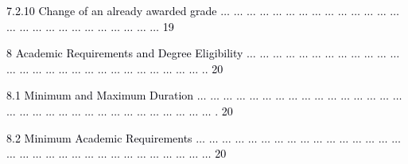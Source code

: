 \documentclass[12pt]{article}
\begin{document}
\vspace{\baselineskip}
\begin{adjustwidth}{0.5in}{0.0in}
{\fontsize{7pt}{8.4pt}\selectfont \textcolor[HTML]{00000A}{7.2.10 Change of an already awarded grade $ \ldots $ $ \ldots $ $ \ldots $ $ \ldots $ $ \ldots $ $ \ldots $ $ \ldots $ $ \ldots $ $ \ldots $ $ \ldots $ $ \ldots $ $ \ldots $ $ \ldots $ $ \ldots $ $ \ldots $ $ \ldots $ $ \ldots $ $ \ldots $ $ \ldots $ $ \ldots $ $ \ldots $ $ \ldots $ $ \ldots $ $ \ldots $ $ \ldots $ $ \ldots $  19}\par}\par

\end{adjustwidth}


\vspace{\baselineskip}
{\fontsize{7pt}{8.4pt}\selectfont \textcolor[HTML]{00000A}{8 Academic Requirements and Degree Eligibility $ \ldots $ $ \ldots $ $ \ldots $ $ \ldots $ $ \ldots $ $ \ldots $ $ \ldots $ $ \ldots $ $ \ldots $ $ \ldots $ $ \ldots $ $ \ldots $ $ \ldots $ $ \ldots $ $ \ldots $ $ \ldots $ $ \ldots $ $ \ldots $ $ \ldots $ $ \ldots $ $ \ldots $ $ \ldots $ $ \ldots $ $ \ldots $ $ \ldots $ $ \ldots $ $ \ldots $ .. 20}\par}\par


\vspace{\baselineskip}
\begin{adjustwidth}{0.21in}{0.0in}
{\fontsize{7pt}{8.4pt}\selectfont \textcolor[HTML]{00000A}{8.1 Minimum and Maximum Duration $ \ldots $ $ \ldots $ $ \ldots $ $ \ldots $ $ \ldots $ $ \ldots $ $ \ldots $ $ \ldots $ $ \ldots $ $ \ldots $ $ \ldots $ $ \ldots $ $ \ldots $ $ \ldots $ $ \ldots $ $ \ldots $ $ \ldots $ $ \ldots $ $ \ldots $ $ \ldots $ $ \ldots $ $ \ldots $ $ \ldots $ $ \ldots $ $ \ldots $ $ \ldots $ $ \ldots $ $ \ldots $ $ \ldots $ $ \ldots $ $ \ldots $ $ \ldots $ . 20}\par}\par

\end{adjustwidth}


\vspace{\baselineskip}
\begin{adjustwidth}{0.21in}{0.0in}
{\fontsize{7pt}{8.4pt}\selectfont \textcolor[HTML]{00000A}{8.2 Minimum Academic Requirements $ \ldots $ $ \ldots $ $ \ldots $ $ \ldots $ $ \ldots $ $ \ldots $ $ \ldots $ $ \ldots $ $ \ldots $ $ \ldots $ $ \ldots $ $ \ldots $ $ \ldots $ $ \ldots $ $ \ldots $ $ \ldots $ $ \ldots $ $ \ldots $ $ \ldots $ $ \ldots $ $ \ldots $ $ \ldots $ $ \ldots $ $ \ldots $ $ \ldots $ $ \ldots $ $ \ldots $ $ \ldots $ $ \ldots $ $ \ldots $ $ \ldots $ $ \ldots $  20}\par}\par

\end{adjustwidth}
\end{document}
